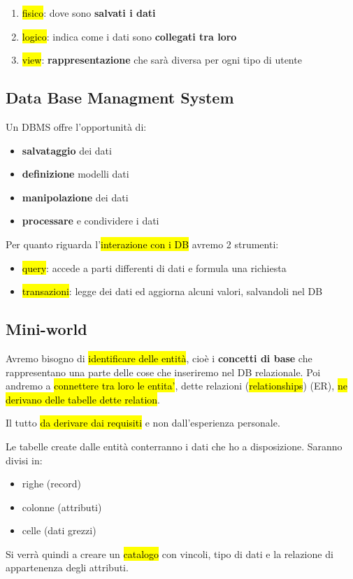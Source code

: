 \begin{enumerate}
	\item \hl{fisico}: dove sono \textbf{salvati i dati}
	\item \hl{logico}: indica come i dati sono \textbf{collegati tra loro}
	\item \hl{view}: \textbf{rappresentazione} che sarà diversa per ogni tipo di utente
\end{enumerate}


\subsection{Data Base Managment System}

Un DBMS offre l'opportunità di:

\begin{itemize}
	\item \textbf{salvataggio} dei dati
	\item \textbf{definizione} modelli dati
	\item \textbf{manipolazione} dei dati
	\item \textbf{processare} e condividere i dati
\end{itemize}

Per quanto riguarda l'\hl{interazione con i DB} avremo 2 strumenti:

\begin{itemize}
	\item \hl{query}: accede a parti differenti di dati e formula una richiesta
	\item \hl{transazioni}: legge dei dati ed aggiorna alcuni valori, salvandoli nel DB
\end{itemize}


\subsection{Mini-world}

Avremo bisogno di \hl{identificare delle entità}, cioè i \textbf{concetti di base} che rappresentano una parte delle cose che inseriremo nel DB relazionale. Poi andremo a \hl{connettere tra loro le entita'}, dette relazioni (\hl{relationships}) (ER), \hl{ne derivano delle tabelle dette relation}.

Il tutto \hl{da derivare dai requisiti} e non dall'esperienza personale.

Le tabelle create dalle entità conterranno i dati che ho a disposizione. Saranno divisi in:

\begin{itemize}
	\item righe (record)
	\item colonne (attributi)
	\item celle (dati grezzi)
\end{itemize}


Si verrà quindi a creare un \hl{catalogo} con vincoli, tipo di dati e la relazione di appartenenza degli attributi.
